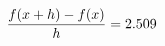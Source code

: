 \documentclass[preview]{standalone}
\begin{document}
\begin{align*}
\special{dvisvgm:raw <g id='unique000'>}\frac{f(x+h)-f(x)}{h} = 2.509\special{dvisvgm:raw </g>}
\end{align*}
\end{document}
